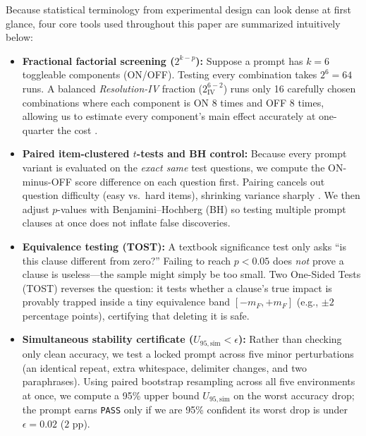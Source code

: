 \documentclass[11pt,a4paper]{article}
\begin{document}
Because statistical terminology from experimental design can look dense at first glance, four core tools used throughout this paper are summarized intuitively below:
\begin{itemize}[leftmargin=*,nosep]
    \item \textbf{Fractional factorial screening ($2^{k-p}$):} Suppose a prompt has $k=6$ toggleable components (ON/OFF). Testing every combination takes $2^6=64$ runs. A balanced \emph{Resolution-IV} fraction ($2^{6-2}_{\mathrm{IV}}$) runs only 16 carefully chosen combinations where each component is ON 8 times and OFF 8 times, allowing us to estimate every component's main effect accurately at one-quarter the cost \citep{box2005statistics,wu2011experiments}.
    \item \textbf{Paired item-clustered $t$-tests and BH control:} Because every prompt variant is evaluated on the \emph{exact same} test questions, we compute the ON-minus-OFF score difference on each question first. Pairing cancels out question difficulty (easy vs.\ hard items), shrinking variance sharply \citep{miller2024adding}. We then adjust $p$-values with Benjamini--Hochberg (BH) \citep{benjamini1995controlling} so testing multiple prompt clauses at once does not inflate false discoveries.
    \item \textbf{Equivalence testing (TOST):} A textbook significance test only asks ``is this clause different from zero?'' Failing to reach $p < 0.05$ does \emph{not} prove a clause is useless---the sample might simply be too small. Two One-Sided Tests (TOST) \citep{schuirmann1987comparison} reverses the question: it tests whether a clause's true impact is provably trapped inside a tiny equivalence band $[-m_F, +m_F]$ (e.g., $\pm 2$ percentage points), certifying that deleting it is safe.
    \item \textbf{Simultaneous stability certificate ($U_{95,\mathrm{sim}} < \epsilon$):} Rather than checking only clean accuracy, we test a locked prompt across five minor perturbations (an identical repeat, extra whitespace, delimiter changes, and two paraphrases). Using paired bootstrap resampling across all five environments at once, we compute a 95\% upper bound $U_{95,\mathrm{sim}}$ on the worst accuracy drop; the prompt earns \texttt{PASS} only if we are 95\% confident its worst drop is under $\epsilon = 0.02$ ($2\text{ pp}$).
\end{itemize}
\end{document}
